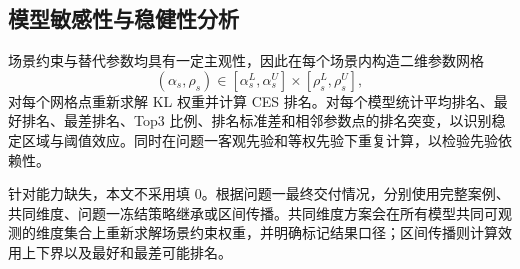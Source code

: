 \subsection{模型敏感性与稳健性分析}

场景约束与替代参数均具有一定主观性，因此在每个场景内构造二维参数网格
\[
(\alpha_s,\rho_s)\in
[\alpha_s^L,\alpha_s^U]\times[\rho_s^L,\rho_s^U],
\]
对每个网格点重新求解 KL 权重并计算 CES 排名。对每个模型统计平均排名、最好排名、最差排名、Top3 比例、排名标准差和相邻参数点的排名突变，以识别稳定区域与阈值效应。同时在问题一客观先验和等权先验下重复计算，以检验先验依赖性。

针对能力缺失，本文不采用填 0。根据问题一最终交付情况，分别使用完整案例、共同维度、问题一冻结策略继承或区间传播。共同维度方案会在所有模型共同可观测的维度集合上重新求解场景约束权重，并明确标记结果口径；区间传播则计算效用上下界以及最好和最差可能排名。

